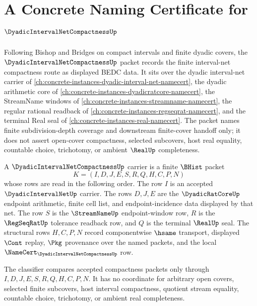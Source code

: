 \chapter{A Concrete Naming Certificate for $\DyadicIntervalNetCompactnessUp$}
\label{ch:concrete-instances-dyadic-interval-net-compactness-namecert}

Following Bishop and Bridges on compact intervals and finite dyadic covers, the $\DyadicIntervalNetCompactnessUp$ packet records the finite interval-net compactness route as displayed BEDC data. It sits over the dyadic interval-net carrier of \autoref{ch:concrete-instances-dyadic-interval-net-namecert}, the dyadic arithmetic core of \autoref{ch:concrete-instances-dyadicratcore-namecert}, the StreamName windows of \autoref{ch:concrete-instances-streamname-namecert}, the regular rational readback of \autoref{ch:concrete-instances-regseqrat-namecert}, and the terminal Real seal of \autoref{ch:concrete-instances-real-namecert}. The packet names finite subdivision-depth coverage and downstream finite-cover handoff only; it does not assert open-cover compactness, selected subcovers, host real equality, countable choice, trichotomy, or ambient $\RealUp$ completeness.

\begin{definition}
\label{def:dyadic-interval-net-compactness-carrier}
A $\DyadicIntervalNetCompactnessUp$ carrier is a finite $\BHist$ packet
$$
K=(I,D,J,E,S,R,Q,H,C,P,N)
$$
whose rows are read in the following order. The row $I$ is an accepted $\DyadicIntervalNetUp$ carrier. The rows $D,J,E$ are the $\DyadicRatCoreUp$ endpoint arithmetic, finite cell list, and endpoint-incidence data displayed by that net. The row $S$ is the $\StreamNameUp$ endpoint-window row, $R$ is the $\RegSeqRatUp$ tolerance readback row, and $Q$ is the terminal $\RealUp$ seal. The structural rows $H,C,P,N$ record componentwise $\hsame$ transport, displayed $\Cont$ replay, $\Pkg$ provenance over the named packets, and the local $\NameCert_{\DyadicIntervalNetCompactnessUp}$ row.

The classifier compares accepted compactness packets only through $I,D,J,E,S,R,Q,H,C,P,N$. It has no coordinate for arbitrary open covers, selected finite subcovers, host interval compactness, quotient stream equality, countable choice, trichotomy, or ambient real completeness.
\end{definition}

